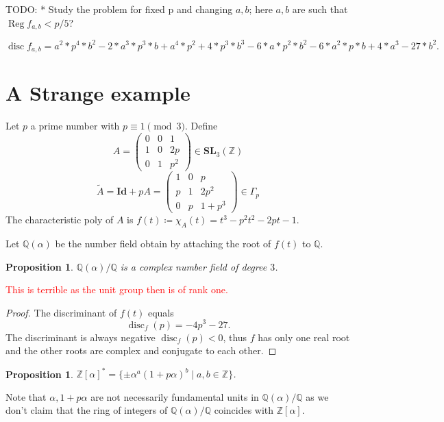 \documentclass[a4paper]{article}
\newcommand{\red}{\textcolor{red}} %
\newtheorem{Prop}[Thm]{Proposition}
\DeclareMathOperator{\assign}{\coloneqq}        %
\newcommand{\Q}{\mathbb{Q}}        %
\newcommand{\Id}{\mathbf{Id}}        %
\newcommand{\SL}{\mathbf{SL}_3(\mathbb{Z})}        %
\newcommand{\SLp}{\Gamma_p}        %
\DeclareMathOperator{\Reg}{Reg}        %
\DeclareMathOperator{\disc}{disc}        %
\begin{document}
TODO:
* Study the problem for fixed p and changing $a, b$;
here $a, b$ are such that $\Reg f_{a,b} < p/5$?

\[
\disc f_{a,b} 
= a^2*p^4*b^2 - 2*a^3*p^3*b + a^4*p^2 + 4*p^3*b^3 - 6*a*p^2*b^2 - 6*a^2*p*b + 4*a^3 - 27*b^2
.\] 

\section{A Strange example}
Let $p$ a prime number with $p \equiv 1 \pmod 3$.
Define
\begin{equation}
\label{matrix_small}
A = 
\begin{pmatrix}
0 & 0 & 1 \\
1 & 0 & 2p \\
0 & 1 & p^2
\end{pmatrix}
\in \SL
\end{equation}
\begin{equation}
\label{matrix_big}
\tilde A = \Id + p A =
\begin{pmatrix}
1 & 0 & p \\
p & 1 & 2 p^2 \\
0 & p & 1 + p^3
\end{pmatrix}
\in \SLp
\end{equation}
The characteristic poly of $A$ is $ f(t) \assign \chi_A(t) = t^3 - p^2 t^2 - 2 p t - 1$.

Let $\Q(\alpha)$ be the number field obtain by attaching the root of $f(t)$ to $\Q$.
\begin{Prop}
$\Q(\alpha) / \Q$ is a complex number field of degree $3$.
\end{Prop}
\red{This is terrible as the unit group then is of rank one.}

\begin{proof}
The discriminant of $f(t)$ equals
$$\disc_f(p) = -4 p^3 - 27 .$$
The discriminant is always negative $\disc_f(p) < 0$, thus $f$ has only one real root and the other roots are complex and conjugate to each other.
\end{proof}


\begin{Prop}
$\mathbb{Z}[\alpha]^{*} = \{ \pm \alpha^a (1 + p \alpha)^b \mid a, b \in \mathbb{Z} \} $.
\end{Prop}

Note that $\alpha, 1 + p \alpha$ are not necessarily fundamental units in $\Q(\alpha)/\Q$ as we don't claim that the ring of integers of $\Q(\alpha) / \Q$ coincides with $\mathbb{Z}[\alpha]$.
\end{document}
